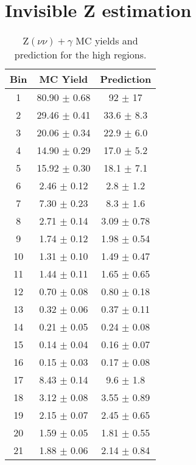 \section{Invisible Z estimation}
\vspace{2.5cm}
\begin{table}[!htbp]
\centering
\captionsetup{width=.9\linewidth}
\caption[Z$(\nu\nu)+\gamma$ predictions in high \dphi]{Z$(\nu\nu)+\gamma$ MC yields and prediction for the high \dphi regions.}
\label{tab:znnPredictions}
\begin{tabular}{c|c|c}
Bin  & MC Yield & Prediction \\ \hline\hline
1 & 80.90  $\pm$  0.68  & 92 $\pm$ 17    \\\hline
2 & 29.46  $\pm$  0.41  & 33.6 $\pm$ 8.3    \\\hline
3 & 20.06  $\pm$  0.34  & 22.9 $\pm$ 6.0    \\\hline
4 & 14.90  $\pm$  0.29  & 17.0 $\pm$ 5.2    \\\hline
5 & 15.92  $\pm$  0.30  & 18.1 $\pm$ 7.1    \\\hline
6 & 2.46  $\pm$  0.12  & 2.8 $\pm$ 1.2    \\\hline
7 & 7.30  $\pm$  0.23  & 8.3 $\pm$ 1.6    \\\hline
8 & 2.71  $\pm$  0.14  & 3.09 $\pm$ 0.78    \\\hline
9 & 1.74  $\pm$  0.12  & 1.98 $\pm$ 0.54    \\\hline
10 & 1.31  $\pm$  0.10  & 1.49 $\pm$ 0.47    \\\hline
11 & 1.44  $\pm$  0.11  & 1.65 $\pm$ 0.65    \\\hline
12 & 0.70  $\pm$  0.08  & 0.80 $\pm$ 0.18    \\\hline
13 & 0.32  $\pm$  0.06  & 0.37 $\pm$ 0.11    \\\hline
14 & 0.21  $\pm$  0.05  & 0.24 $\pm$ 0.08    \\\hline
15 & 0.14  $\pm$  0.04  & 0.16 $\pm$ 0.07    \\\hline
16 & 0.15  $\pm$  0.03  & 0.17 $\pm$ 0.08    \\\hline
17 & 8.43  $\pm$  0.14  & 9.6 $\pm$ 1.8    \\\hline
18 & 3.12  $\pm$  0.08  & 3.55 $\pm$ 0.89    \\\hline
19 & 2.15  $\pm$  0.07  & 2.45 $\pm$ 0.65    \\\hline
20 & 1.59  $\pm$  0.05  & 1.81 $\pm$ 0.55    \\\hline
21 & 1.88  $\pm$  0.06  & 2.14 $\pm$ 0.84    \\\hline

\end{tabular}
\end{table}

